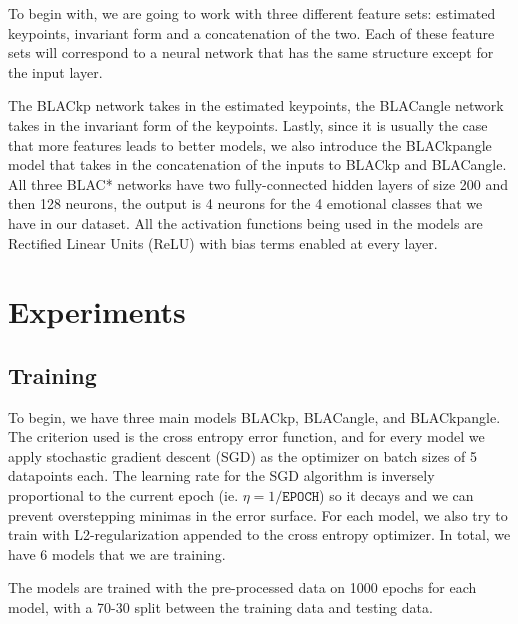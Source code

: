 \documentclass{article}
\begin{document}
To begin with, we are going to work with three different feature sets: estimated keypoints, invariant form and a concatenation of the two. Each of these feature sets will correspond to a neural network that has the same structure except for the input layer. 

The BLACkp network takes in the estimated keypoints, the BLACangle network takes in the invariant form of the keypoints. Lastly, since it is usually the case that more features leads to better models, we also introduce the BLACkpangle model that takes in the concatenation of the inputs to BLACkp and BLACangle. All three BLAC* networks have two fully-connected hidden layers of size 200 and then 128 neurons, the output is 4 neurons for the 4 emotional classes that we have in our dataset. All the activation functions being used in the models are Rectified Linear Units (ReLU) with bias terms enabled at every layer.


\section{Experiments}

\subsection{Training}

To begin, we have three main models BLACkp, BLACangle, and BLACkpangle. The criterion used is the cross entropy error function, and for every model we apply stochastic gradient descent (SGD) as the optimizer on batch sizes of 5 datapoints each. The learning rate for the SGD algorithm is inversely proportional to the current epoch (ie. $\eta = 1/\mathtt{EPOCH}$) so it decays and we can prevent overstepping minimas in the error surface.  For each model, we also try to train with L2-regularization appended to the cross entropy optimizer. In total, we have 6 models that we are training.

The models are trained with the pre-processed data on 1000 epochs for each model, with a 70-30 split between the training data and testing data.
\end{document}
